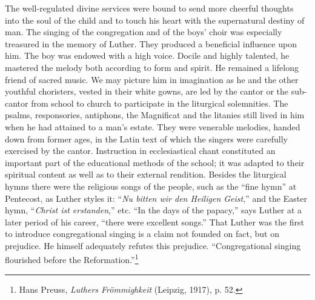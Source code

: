 The well-regulated divine services were bound to send more cheerful thoughts into the soul of the child and to touch his heart
with the supernatural destiny of man.
The singing of the congregation and of the boys’ choir was
especially treasured in the memory of Luther. They produced a
beneficial influence upon him. The boy was endowed with a high
voice. Docile and highly talented, he mastered the melody both according
to form and spirit. He remained a lifelong friend of sacred
music. We may picture him in imagination as he and the other
youthful choristers, vested in their white gowns, are led by the
cantor or the sub-cantor from school to church to participate in
the liturgical solemnities. The psalms, responsories, antiphons, the
Magnificat and the litanies still lived in him when he had attained
to a man’s estate. They were venerable melodies, handed down from
former ages, in the Latin text of which the singers were carefully
exercised by the cantor. Instruction in ecclesiastical chant constituted
an important part of the educational methods of the school; it was
adapted to their spiritual content as well as to their external
rendition. Besides the liturgical hymns there were the religious songs
of the people, such as the “fine hymn” at Pentecost, as Luther styles
it: “\textit{Nu bitten wir den Heiligen Geist},” and the Easter hymn,
“\textit{Christ ist erstanden},” etc. “In the days of the papacy,” says Luther
at a later period of his career, “there were excellent songs.” That
Luther was the first to introduce congregational singing is a claim
not founded on fact, but on prejudice. He himself adequately refutes this prejudice. “Congregational singing flourished before the
Reformation.”\footnote{Hans Preuss, \textit{Luthers Frömmighkeit} (Leipzig, 1917), p. 52.}

